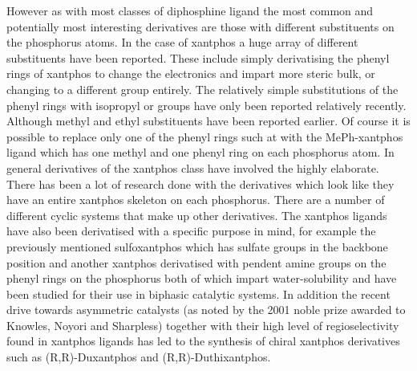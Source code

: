 However as with most classes of diphosphine ligand the most common and potentially most interesting derivatives are those with different substituents on the phosphorus atoms.  In the case of xantphos a huge array of different substituents have been reported.  These include simply derivatising the phenyl rings of xantphos to change the electronics and impart more steric bulk, or changing to a different group entirely.  The relatively simple substitutions of the phenyl rings with isopropyl or \tBu{} groups have only been reported relatively recently.  Although methyl and ethyl substituents have been reported earlier.  Of course it is possible to replace only one of the phenyl rings such at with the MePh-xantphos ligand which has one methyl and one phenyl ring on each phosphorus atom.  In general derivatives of the xantphos class have involved the highly elaborate.  There has been a lot of research done with the derivatives which look like they have an entire xantphos skeleton on each phosphorus.  There are a number of different cyclic systems that make up other derivatives.  The xantphos ligands have also been derivatised with a specific purpose in mind, for example the previously mentioned sulfoxantphos which has sulfate groups in the backbone position and another xantphos derivatised with pendent amine groups on the phenyl rings on the phosphorus both of which impart water-solubility and have been studied for their use in biphasic catalytic systems.  In addition the recent drive towards asymmetric catalysts (as noted by the 2001 noble prize awarded to Knowles, Noyori and Sharpless) together with their high level of regioselectivity found in xantphos ligands has led to the synthesis of chiral xantphos derivatives such as (R,R)-Duxantphos and (R,R)-Duthixantphos.  


